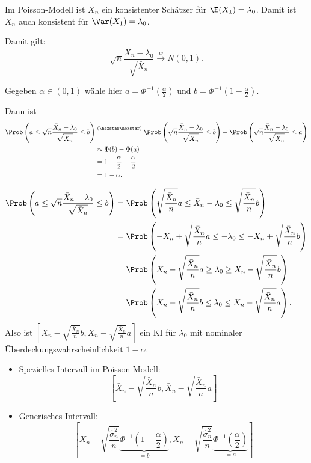 \documentclass{tstextbook}
\begin{document}
\begin{example}
	
	Im Poisson-Modell ist $ \bar{X}_n $ ein konsistenter Schätzer für $ \E(X_1) = \lambda_0 $. Damit ist $ \bar{X}_n $ auch konsistent für $ \Var(X_1) = \lambda_0 $. 
	
	Damit gilt: 
	\[
	\sqrt{n} \frac{\bar{X}_n-\lambda_0}{\sqrt{\bar{X}_n}} \overset{w}{\longrightarrow} N(0,1). \tag{$\hexstar\hexstar$}
	\]
	
	Gegeben $ \alpha \in (0,1) $ wähle hier $ a = \Phi^{-1} \left(\frac{\alpha}{2}\right) $ und $ b = \Phi^{-1} \left( 1 - \frac{\alpha}{2} \right) $. 
	
	Dann ist 
	\[
	\begin{aligned}
		\Prob\left(a \le \sqrt{n} \frac{\bar{X}_n - \lambda_0}{\sqrt{\bar{X}_n}} \le b \right) & \overset{(\hexstar\hexstar)}{=} \Prob\left(\sqrt{n} \frac{\bar{X}_n - \lambda_0}{\sqrt{\bar{X}_n}} \le b \right) - \Prob\left(\sqrt{n} \frac{\bar{X}_n - \lambda_0}{\sqrt{\bar{X}_n}} \le a \right) \\
		& \approx \Phi (b) - \Phi (a) \\
		& = 1 - \frac{\alpha}{2} - \frac{\alpha}{2} \\
		& = 1 - \alpha.
	\end{aligned}
	\]
	
	\[
	\begin{aligned}
		\Prob\left(a \le \sqrt{n} \frac{\bar{X}_n - \lambda_0}{\sqrt{\bar{X}_n}} \le b \right) & = \Prob \left(\sqrt{\frac{\bar{X}_n}{n}} a \le \bar{X}_n - \lambda_0 \le \sqrt{\frac{\bar{X}_n}{n}} b \right) \\
		& = \Prob \left(- \bar{X}_n + \sqrt{\frac{\bar{X}_n}{n}} a \le  - \lambda_0 \le - \bar{X}_n + \sqrt{\frac{\bar{X}_n}{n}} b \right) \\
		& = \Prob \left(\bar{X}_n - \sqrt{\frac{\bar{X}_n}{n}} a \ge   \lambda_0 \ge  \bar{X}_n - \sqrt{\frac{\bar{X}_n}{n}} b \right) \\
		& = \Prob \left(\bar{X}_n - \sqrt{\frac{\bar{X}_n}{n}} b \le   \lambda_0 \le  \bar{X}_n - \sqrt{\frac{\bar{X}_n}{n}} a \right).
	\end{aligned}
	\]
	Also ist $ \left[\bar{X}_n - \sqrt{\frac{\bar{X}_n}{n}} b, \bar{X}_n - \sqrt{\frac{\bar{X}_n}{n}} a \right] $ ein KI für $ \lambda_0 $ mit nominaler Überdeckungswahrscheinlichkeit $ 1-\alpha $. 
	
	\begin{itemize}
		\item Spezielles Intervall im Poisson-Modell: 
		\[
		\left[\bar{X}_n - \sqrt{\frac{\bar{X}_n}{n}} b, \bar{X}_n - \sqrt{\frac{\bar{X}_n}{n}} a \right]
		\]
		
		\item Generisches Intervall: 
		\[
		\left[\bar{X}_n - \sqrt{\frac{\hat{\sigma}_n^2}{n}} \underbrace{\Phi^{-1}\left(1-\frac{\alpha}{2}\right)}_{=b}, \bar{X}_n - \sqrt{ \frac{\hat{\sigma}_n^2}{n}} \underbrace{\Phi^{-1}\left(\frac{\alpha}{2}\right)}_{=a} \right]
		\]
	\end{itemize}
	
\end{example}
\end{document}
